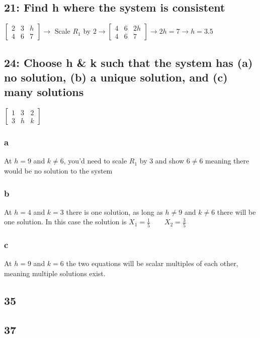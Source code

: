 \documentclass{article}
\begin{document}
\subsection*{21: Find h where the system is consistent}
$\left[\begin{array}{cc|c}
    2 & 3 & h \\
    4 & 6 & 7 
\end{array}\right] \rightarrow$ Scale $R_1$ by $2 \rightarrow
\left[\begin{array}{cc|c}
    4 & 6 & 2h \\
    4 & 6 & 7 
\end{array}\right] \rightarrow 2h=7 \rightarrow \boxed{h=3.5}
$
\subsection*{24: Choose h \& k such that the system has (a) no solution, (b) a unique solution, and (c) many solutions}
$\left[\begin{array}{cc|c}
    1 & 3 & 2 \\
    3 & h & k 
\end{array}\right]$
\subsubsection*{a}
At $h=9$ and $k\neq 6$, you'd need to scale $R_1$ by 3 and show $6\neq 6$ meaning there would be no solution to the system
\subsubsection*{b}
At $h=4$ and $k=3$ there is one solution, as long as $h \neq 9$ and $k \neq 6$ there will be one solution. In this case the solution is $X_1=\frac{1}{5} \qquad X_2 = \frac{3}{5}$
\subsubsection*{c}
At $h=9$ and $k=6$ the two equations will be scalar multiples of each other, meaning multiple solutions exist.
\subsection*{35}
\subsection*{37}
\end{document}
